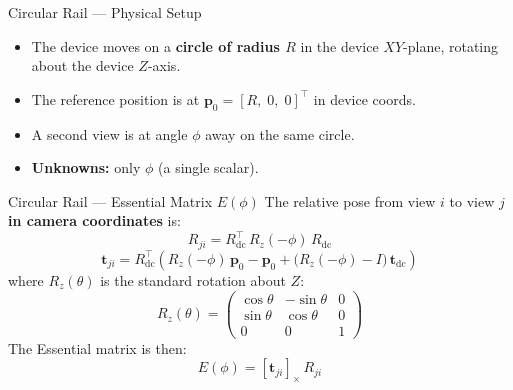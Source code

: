 \documentclass[aspectratio=169, 12pt]{beamer}
\newcommand{\Rdc}{R_{\mathrm{dc}}}
\newcommand{\tdc}{\mathbf{t}_{\mathrm{dc}}}
\newcommand{\skewmat}[1]{\left[#1\right]_{\times}}
\begin{document}
\begin{frame}{Circular Rail --- Physical Setup}
\small
\begin{itemize}\setlength{\itemsep}{2pt}
    \item The device moves on a \textbf{circle of radius $R$} in the device $XY$-plane,
          rotating about the device $Z$-axis.
    \item The reference position is at $\mathbf{p}_0 = [R,\; 0,\; 0]^\top$ in device coords.
    \item A second view is at angle $\phi$ away on the same circle.
    \item \textbf{Unknowns:} only $\phi$ (a single scalar).
\end{itemize}

\begin{center}
\end{center}
\end{frame}

\begin{frame}{Circular Rail --- Essential Matrix $E(\phi)$}
\small
The relative pose from view $i$ to view $j$ \textbf{in camera coordinates} is:
\vspace{-0.3em}
\[
    R_{ji} = \Rdc^\top \, R_z(-\phi) \, \Rdc
\]
\vspace{-1.2em}
\[
    \mathbf{t}_{ji} = \Rdc^\top \!\left(
        R_z(-\phi)\,\mathbf{p}_0 - \mathbf{p}_0
        + \bigl(R_z(-\phi) - I\bigr)\,\tdc
    \right)
\]
\vspace{-0.5em}
where $R_z(\theta)$ is the standard rotation about $Z$:
\vspace{-0.3em}
\[
    R_z(\theta) = \begin{pmatrix}
        \cos\theta & -\sin\theta & 0 \\
        \sin\theta &  \cos\theta & 0 \\
        0          &  0          & 1
    \end{pmatrix}
\]
\vspace{-0.5em}
The Essential matrix is then:
\vspace{-0.3em}
\[
    \boxed{E(\phi) = \skewmat{\mathbf{t}_{ji}} \, R_{ji}}
\]
\end{frame}
\end{document}
